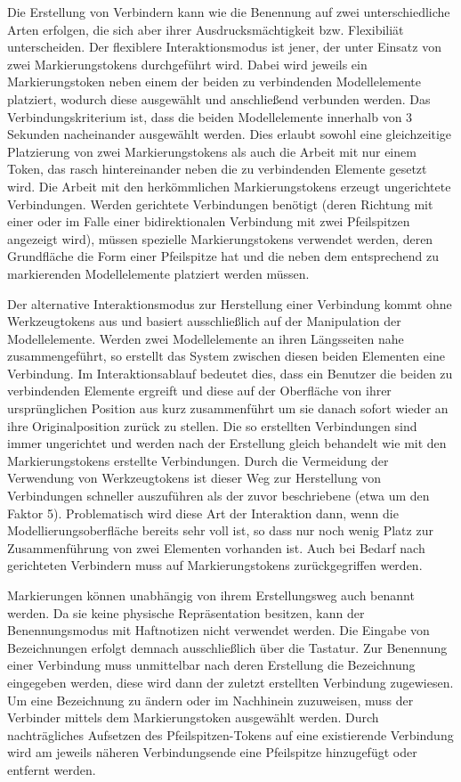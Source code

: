 Die Erstellung von Verbindern kann wie die Benennung auf zwei unterschiedliche Arten erfolgen, die sich aber ihrer Ausdrucksmächtigkeit bzw. Flexibiliät unterscheiden. Der flexiblere Interaktionsmodus ist jener, der unter Einsatz von zwei Markierungstokens durchgeführt wird. Dabei wird jeweils ein Markierungstoken neben einem der beiden zu verbindenden Modellelemente platziert, wodurch diese ausgewählt und anschließend verbunden werden. Das Verbindungskriterium ist, dass die beiden Modellelemente innerhalb von 3 Sekunden nacheinander ausgewählt werden. Dies erlaubt sowohl eine gleichzeitige Platzierung von zwei Markierungstokens als auch die Arbeit mit nur einem Token, das rasch hintereinander neben die zu verbindenden Elemente gesetzt wird. Die Arbeit mit den herkömmlichen Markierungstokens erzeugt ungerichtete Verbindungen. Werden gerichtete Verbindungen benötigt (deren Richtung mit einer oder im Falle einer bidirektionalen Verbindung mit zwei Pfeilspitzen angezeigt wird), müssen spezielle Markierungstokens verwendet werden, deren Grundfläche die Form einer Pfeilspitze hat und die neben dem entsprechend zu markierenden Modellelemente platziert werden müssen.

Der alternative Interaktionsmodus zur Herstellung einer Verbindung kommt ohne Werkzeugtokens aus und basiert ausschließlich auf der Manipulation der Modellelemente. Werden zwei Modellelemente an ihren Längsseiten nahe zusammengeführt, so erstellt das System zwischen diesen beiden Elementen eine Verbindung. Im Interaktionsablauf bedeutet dies, dass ein Benutzer die beiden zu verbindenden Elemente ergreift und diese auf der Oberfläche von ihrer ursprünglichen Position aus kurz zusammenführt um sie danach sofort wieder an ihre Originalposition zurück zu stellen. Die so erstellten Verbindungen sind immer ungerichtet und werden nach der Erstellung gleich behandelt wie mit den Markierungstokens erstellte Verbindungen. Durch die Vermeidung der Verwendung von Werkzeugtokens ist dieser Weg zur Herstellung von Verbindungen schneller auszuführen als der zuvor beschriebene (etwa um den Faktor 5). Problematisch wird diese Art der Interaktion dann, wenn die Modellierungsoberfläche bereits sehr voll ist, so dass nur noch wenig Platz zur Zusammenführung von zwei Elementen vorhanden ist. Auch bei Bedarf nach gerichteten Verbindern muss auf Markierungstokens zurückgegriffen werden.

Markierungen können unabhängig von ihrem Erstellungsweg auch benannt werden. Da sie keine physische Repräsentation besitzen, kann der Benennungsmodus mit Haftnotizen nicht verwendet werden. Die Eingabe von Bezeichnungen erfolgt demnach ausschließlich über die Tastatur. Zur Benennung einer Verbindung muss unmittelbar nach deren Erstellung die Bezeichnung eingegeben werden, diese wird dann der zuletzt erstellten Verbindung zugewiesen. Um eine Bezeichnung zu ändern oder im Nachhinein zuzuweisen, muss der Verbinder mittels dem Markierungstoken ausgewählt werden. Durch nachträgliches Aufsetzen des Pfeilspitzen-Tokens auf eine existierende Verbindung wird am jeweils näheren Verbindungsende eine Pfeilspitze hinzugefügt oder entfernt werden.


